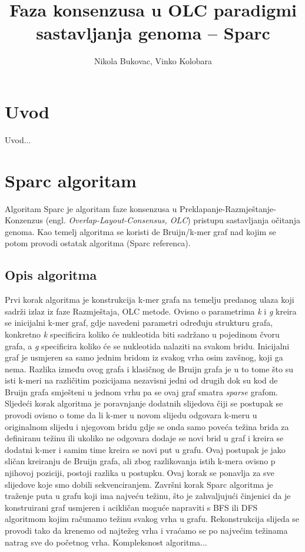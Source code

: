 \documentclass[times, utf8, seminar, numeric]{fer}
\begin{document}
\nocite{*}

\title{Faza konsenzusa u OLC paradigmi sastavljanja genoma – Sparc}

\author{Nikola Bukovac, Vinko Kolobara}


\maketitle

\tableofcontents

\chapter{Uvod}
Uvod...

\chapter{Sparc algoritam}
Algoritam Sparc je algoritam faze konsenzusa u Preklapanje-Razmještanje-Konzenzus (engl. \emph{Overlap-Layout-Consensus, OLC}) pristupu sastavljanja očitanja genoma. Kao temelj algoritma se koristi de Bruijn/k-mer graf nad kojim se potom provodi ostatak algoritma (Sparc referenca).
\section{Opis algoritma}
Prvi korak algoritma je konstrukcija k-mer grafa na temelju predanog ulaza koji sadrži izlaz iz faze Razmještaja, OLC metode. Ovisno o parametrima \emph{k} i \emph{g} kreira se inicijalni k-mer graf, gdje navedeni parametri određuju strukturu grafa, konkretno \emph{k} specificira koliko će nukleotida biti sadržano u pojedinom čvoru grafa, a \emph{g} specificira koliko će se nukleotida nalaziti na svakom bridu. Inicijalni graf je usmjeren sa samo jednim bridom iz svakog vrha osim zavšnog, koji ga nema. Razlika između ovog grafa i klasičnog de Bruijn grafa je u to tome što su isti k-meri na različitim pozicijama nezavisni jedni od drugih dok su kod de Bruijn grafa smješteni u jednom vrhu pa se ovaj graf smatra \emph {sparse} grafom. Sljedeći korak algoritma je poravnjanje dodatnih slijedova čiji se postupak se provodi ovisno o tome da li k-mer u novom slijedu odgovara k-meru u originalnom slijedu i njegovom bridu gdje se onda samo poveća težina brida za definiranu težinu ili ukoliko ne odgovara dodaje se novi brid u graf i kreira se dodatni k-mer i samim time kreira se novi put u grafu. Ovaj postupak je jako sličan kreiranju de Bruijn grafa, ali zbog razlikovanja istih k-mera ovisno p njihovoj poziciji, postoji razlika u postupku. Ovaj korak se ponavlja za sve slijedove koje smo dobili sekvenciranjem. Završni korak Sparc algoritma je traženje puta u grafu koji ima najveću težinu, što je zahvaljujući činjenici da je konstruirani graf usmjeren i acikličan moguće napraviti s BFS ili DFS algoritmom kojim računamo težinu svakog vrha u grafu. Rekonstrukcija slijeda se provodi tako da krenemo od najtežeg vrha i vraćamo se po najvećim težinama natrag sve do početnog vrha. Kompleksnost algoritma...
\end{document}
